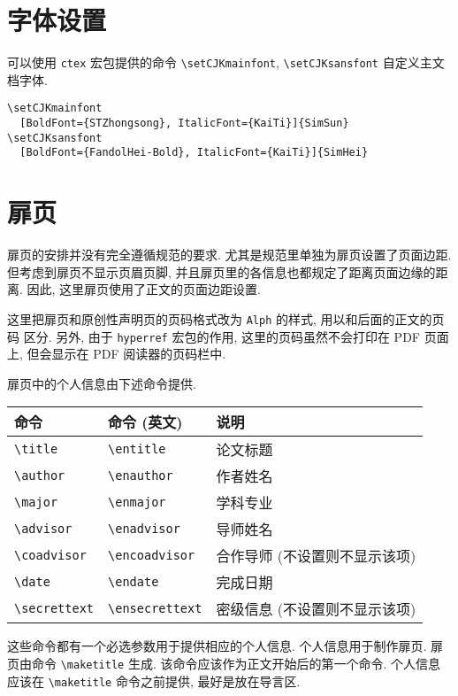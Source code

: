 \section{字体设置}

可以使用 \verb|ctex| 宏包提供的命令 \verb|\setCJKmainfont|, \verb|\setCJKsansfont| 自定义主文档字体.
\begin{verbatim}
\setCJKmainfont
  [BoldFont={STZhongsong}, ItalicFont={KaiTi}]{SimSun}
\setCJKsansfont
  [BoldFont={FandolHei-Bold}, ItalicFont={KaiTi}]{SimHei}
\end{verbatim}

\section{扉页}

扉页的安排并没有完全遵循规范的要求. 尤其是规范里单独为扉页设置了页面边距. 但考虑到扉页不显示页眉页脚, 并且扉页里的各信息也都规定了距离页面边缘的距离. 因此, 这里扉页使用了正文的页面边距设置.

这里把扉页和原创性声明页的页码格式改为 \verb|Alph| 的样式, 用以和后面的正文的页码
区分. 另外, 由于 \verb|hyperref| 宏包的作用, 这里的页码虽然不会打印在 PDF 页面上,
但会显示在 PDF 阅读器的页码栏中.

扉页中的个人信息由下述命令提供.

\begin{center}
  \begin{tabular}{lll}
    \toprule
    命令          & 命令 (英文)     & 说明\\
    \midrule
    \verb|\title|      & \verb|\entitle|      & 论文标题\\
    \verb|\author|     & \verb|\enauthor|     & 作者姓名\\
    \verb|\major|      & \verb|\enmajor|      & 学科专业\\
    \verb|\advisor|    & \verb|\enadvisor|    & 导师姓名\\
    \verb|\coadvisor|  & \verb|\encoadvisor|  & 合作导师 (不设置则不显示该项)\\
    \verb|\date|       & \verb|\endate|       & 完成日期\\
    \verb|\secrettext| & \verb|\ensecrettext| & 密级信息 (不设置则不显示该项)\\
    \bottomrule
  \end{tabular}
\end{center}

这些命令都有一个必选参数用于提供相应的个人信息. 个人信息用于制作扉页. 扉页由命令 \verb|\maketitle| 生成. 该命令应该作为正文开始后的第一个命令. 个人信息应该在 \verb|\maketitle| 命令之前提供, 最好是放在导言区.

